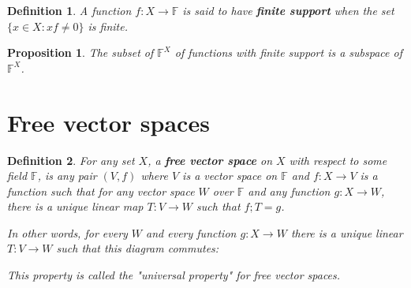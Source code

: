 \documentclass[a4paper,14pt]{article}
\newtheorem*{prop}{Proposition}
\newtheorem*{defn}{Definition}
\begin{document}
\begin{defn}
A function $f: X \to \mathbb{F}$ is said to have \textbf{finite support} when the set $\{x \in X : xf \neq 0\}$ is finite.
\end{defn}

\begin{prop}
The subset of $\mathbb{F}^X$ of functions with finite support is a subspace of $\mathbb{F}^X$.
\end{prop}

\section{Free vector spaces}
\begin{defn}
For any set $X$, a \textbf{free vector space} on $X$ with respect to some field $\mathbb{F}$, is any pair $(V, f)$ where $V$ is a vector space on $\mathbb{F}$ and $f: X \to V$ is a function such that for any vector space $W$ over $\mathbb{F}$ and any function $g: X \to W$, there is a unique linear map $T: V \to W$ such that $f;T = g$.

In other words, for every $W$ and every function $g: X \to W$ there is a unique linear $T: V \to W$ such that this diagram commutes:

\begin{center}
\end{center}

This property is called the "universal property" for free vector spaces.
\end{defn}
\end{document}
